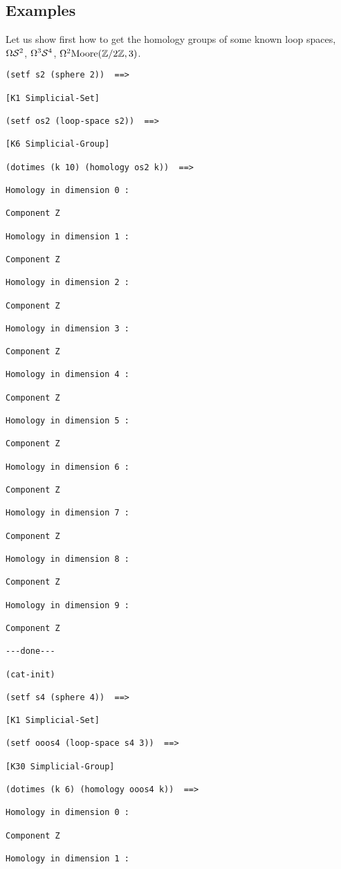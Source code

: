 \subsection* {Examples}

Let us show first how to get the homology groups of some known loop spaces,
$\Omega {\cal S}^2$, $\Omega^3 {\cal S}^4$, $\Omega^2{\rm Moore}({\mathbb{Z}}/{2{\mathbb{Z}}},3)$.
{\footnotesize\begin{verbatim}
(setf s2 (sphere 2))  ==>

[K1 Simplicial-Set]

(setf os2 (loop-space s2))  ==>

[K6 Simplicial-Group]

(dotimes (k 10) (homology os2 k))  ==>

Homology in dimension 0 :

Component Z

Homology in dimension 1 :

Component Z

Homology in dimension 2 :

Component Z

Homology in dimension 3 :

Component Z

Homology in dimension 4 :

Component Z

Homology in dimension 5 :

Component Z

Homology in dimension 6 :

Component Z

Homology in dimension 7 :

Component Z

Homology in dimension 8 :

Component Z

Homology in dimension 9 :

Component Z

---done---

(cat-init)

(setf s4 (sphere 4))  ==>

[K1 Simplicial-Set]

(setf ooos4 (loop-space s4 3))  ==>

[K30 Simplicial-Group]

(dotimes (k 6) (homology ooos4 k))  ==>

Homology in dimension 0 :

Component Z

Homology in dimension 1 :


\end{verbatim}}
